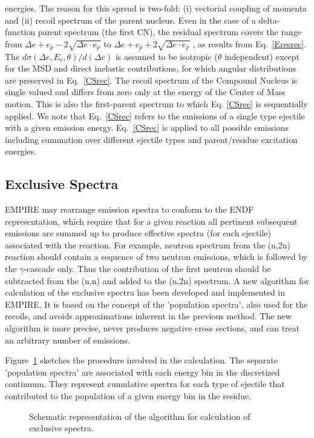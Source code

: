 \documentclass[twocolumn,amsmath,amssymb,10pt,groupedaddress,a4paper]{revtex4}
\begin{document}
energies. The reason for this spread is two-fold: (i) vectorial coupling
of momenta and (ii) recoil spectrum of the parent nucleus. Even in
the case of a delta-function parent spectrum (the first CN), the residual
spectrum covers the range from $\Delta e+e_{p}-2\sqrt{\Delta e\cdot e_{p}}$
to $\Delta e+e_{p}+2\sqrt{\Delta e\cdot e_{p}}$ , as results from
Eq.~\ref{Eresrec}. The $d\sigma(\Delta e,E_{r},\theta)/d(\Delta e)$
is assumed to be isotropic ($\theta$ independent) except for the
MSD and direct inelastic contributions, for which angular
distributions are preserved in Eq.~\ref{CSrec}. The recoil spectrum
of the Compound Nucleus is single valued and differs from zero only
at the energy of the Center of Mass motion. This is also the first-parent
spectrum to which Eq. \ref{CSrec} is sequentially applied. We note
that Eq.~\ref{CSrec} refers to the emissions of a single type ejectile
with a given emission energy. Eq.~\ref{CSrec} is  applied to all
possible emissions including summation over different ejectile types
and parent/residue excitation energies.

\subsection{Exclusive Spectra}
EMPIRE may rearrange emission spectra to conform to the ENDF representation,
which require that for a given reaction all pertinent subsequent emissions
are summed up to produce effective spectra (for each ejectile) associated
with the reaction. For example, neutron spectrum from the (n,2n) reaction
should contain a sequence of two neutron emissions, which is followed
by the $\gamma$-cascade only. Thus the contribution of the first
neutron should be subtracted from the (n,n) and added to the (n,2n)
spectrum.
A new algorithm for calculation of the exclusive spectra has been
developed and implemented in EMPIRE. It is based on the concept
of the 'population spectra', also used for the recoils, and avoids
approximations inherent in the previous method. The new algorithm
is more precise, never produces negative cross sections, and can treat
an arbitrary number of emissions.

Figure~\ref{exclusive} sketches the procedure involved in the calculation.
The separate 'population spectra' are associated with each energy bin in the
discretized continuum. They represent cumulative spectra for each type of ejectile
that contributed to the population of a given energy bin in the residue.
\begin{figure}[htbp]
\caption{\label{exclusive} Schematic representation  of the algorithm for calculation
of exclusive spectra.}
\end{figure}
\end{document}
